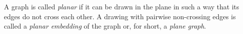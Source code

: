 

\setcounter{section}{3}
\setcounter{subsection}{1}
\setcounter{dfn}{1}

\begin{dfn}
A graph is called \emph{planar} if it can be drawn in the plane in such a way that its edges do not cross each other.
A drawing with pairwise non-crossing edges is called a \emph{planar embedding} of the graph or, for short, a \emph{plane graph}.
\end{dfn}

